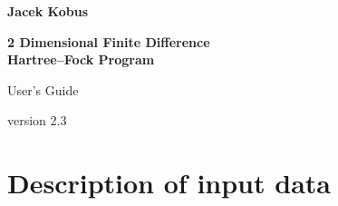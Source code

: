 \documentclass[12pt,a4paper]{article}
\newcommand{\clearemptydoublepage}{\newpage{\pagestyle{empty}\cleardoublepage}}
\begin{document}
\thispagestyle{empty}

\vspace*{4cm}
\begin{center}

{\Large\bf Jacek Kobus\\[20pt]}

{\LARGE\bf 2 Dimensional Finite Difference \\[10pt]
Hartree--Fock Program}

\vskip 1cm

{\Large User's Guide}

\vskip 0.5cm

{\large version 2.3 }
\end{center}

\clearemptydoublepage
\tableofcontents
\thispagestyle{empty}
\clearemptydoublepage



\section{Description of input data}
\end{document}
